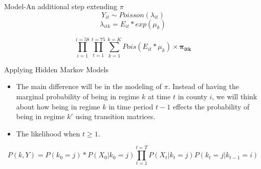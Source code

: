\documentclass[aspectratio=169,xcolor=dvipsnames]{beamer}
\newcommand{\?}{}
\begin{document}
\begin{frame}{Model-An additional step extending $\pi$}
\[Y_{it} \sim Poisson(\lambda_{it})\]
\[\lambda_{itk} = E_{it}*exp(\mu_{k})\]

\[\prod_{i=1}^{i=58}\prod_{t=1}^{t=75}\sum_{k=1}^{k=K}Pois(E_{it}*\mu_k) \times \boldsymbol{\pi_{itk}}\]
\end{frame}

\begin{frame}{Applying Hidden Markov Models}
\begin{itemize}
\item The main difference will be in the modeling of $\pi$. Instead of having the marginal probability of being in regime $k$ at time $t$ in county $i$, we will think about how being in regime $k$ in time period $t-1$ effects the probability of being in regime $k'$ using transition matrices.
\item The likelihood when $t \ge 1$.
\end{itemize}
\[P(k,Y)=P(k_0=j)*P(X_0|k_0=j)\prod_{t=1}^{t=T}P(X_{t}|k_t=j)P(k_t=j|k_{t-1}=i)\]
\end{frame}



\end{document}
